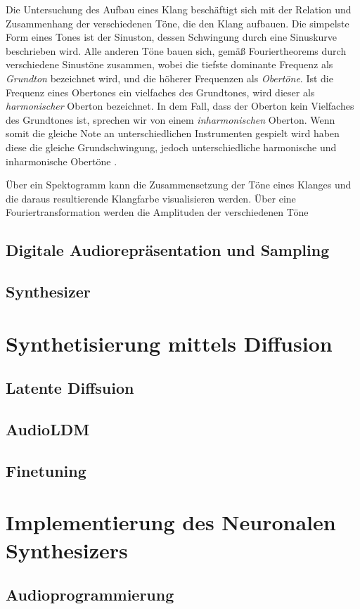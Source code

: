 \documentclass[
  a4paper,  %
  twoside,  %
  bibliography=totoc,
  headsepline,
  cleardoublepage=empty,
  parskip=half,
  draft=false
]{scrbook}
\begin{document}
Die Untersuchung des Aufbau eines Klang beschäftigt sich mit der Relation und Zusammenhang der verschiedenen Töne, die den Klang aufbauen. Die simpelste Form eines Tones ist der Sinuston, dessen Schwingung durch eine Sinuskurve beschrieben wird. Alle anderen Töne bauen sich, gemäß Fouriertheorems durch verschiedene Sinustöne zusammen, wobei die tiefste dominante Frequenz als \emph{Grundton} bezeichnet wird, und die höherer Frequenzen als \emph{Obertöne}. Ist die Frequenz eines Obertones ein vielfaches des Grundtones, wird dieser als \emph{harmonischer} Oberton bezeichnet. In dem Fall, dass der Oberton kein Vielfaches des Grundtones ist, sprechen wir von einem \emph{inharmonischen} Oberton. Wenn somit die gleiche Note an unterschiedlichen Instrumenten gespielt wird haben diese die gleiche Grundschwingung, jedoch unterschiedliche harmonische und inharmonische Obertöne \cite{parker_good_2009, white_physics_2014}.

Über ein Spektogramm kann die Zusammensetzung der Töne eines Klanges und die daraus resultierende Klangfarbe visualisieren werden. Über eine Fouriertransformation werden die Amplituden der verschiedenen Töne 
\subsection{Digitale Audiorepräsentation und Sampling}
\subsection{Synthesizer}

\section{Synthetisierung mittels Diffusion}
\subsection{Latente Diffsuion}
\subsection{AudioLDM}
\subsection{Finetuning}
\section{Implementierung des Neuronalen Synthesizers}
\subsection{Audioprogrammierung}
\end{document}
